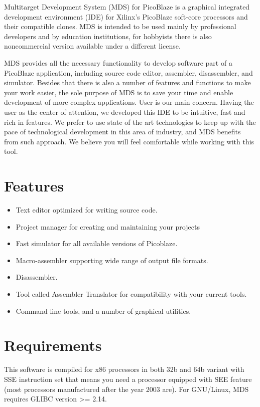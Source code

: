 Multitarget Development System (MDS) for PicoBlaze is a graphical integrated development environment (IDE) for
Xilinx's PicoBlaze soft-core processors and their compatible clones. MDS is intended to be used mainly by professional
developers and by education institutions, for hobbyists there is also noncommercial version available under a different
license.

MDS provides all the necessary functionality to develop software part of a PicoBlaze application, including source code
editor, assembler, disassembler, and simulator. Besides that there is also a number of features and functions to make
your work easier, the sole purpose of MDS is to save your time and enable development of more complex applications. User
is our main concern. Having the user as the center of attention, we developed this IDE to be intuitive, fast and rich in
features. We prefer to use state of the art technologies to keep up with the pace of technological development in this
area of industry, and MDS benefits from such approach. We believe you will feel comfortable while working with this tool.

\section{Features}
    \begin{itemize}
        \item Text editor optimized for writing source code.
        \item Project manager for creating and maintaining your projects
        \item Fast simulator for all available versions of Picoblaze.
        \item Macro-assembler supporting wide range of output file formats.
        \item Disassembler.
        \item Tool called Assembler Translator for compatibility with your current tools.
        \item Command line tools, and a number of graphical utilities.
    \end{itemize}

\section{Requirements}
    This software is compiled for x86 processors in both 32b and 64b variant with SSE instruction set that means you
    need a processor equipped with SEE feature (most processors manufactured after the year 2003 are). For GNU/Linux,
    MDS requires GLIBC version >= 2.14.

